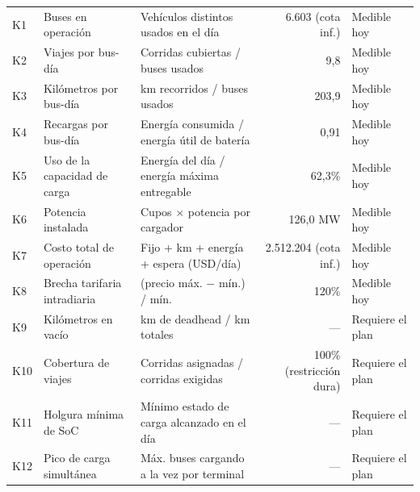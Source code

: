
\begin{tabular}{l L{3.2cm} L{5.0cm} r l}
\thead{} &  &  &  &  \\
\midrule
K1 & Buses en operación & Vehículos distintos usados en el día & 6.603 (cota inf.) & Medible hoy \\
K2 & Viajes por bus-día & Corridas cubiertas / buses usados & 9{,}8 & Medible hoy \\
K3 & Kilómetros por bus-día & km recorridos / buses usados & 203{,}9 & Medible hoy \\
K4 & Recargas por bus-día & Energía consumida / energía útil de batería & 0{,}91 & Medible hoy \\
K5 & Uso de la capacidad de carga & Energía del día / energía máxima entregable & 62{,}3\% & Medible hoy \\
K6 & Potencia instalada & Cupos $\times$ potencia por cargador & 126{,}0 MW & Medible hoy \\
K7 & Costo total de operación & Fijo + km + energía + espera (USD/día) & 2.512.204 (cota inf.) & Medible hoy \\
K8 & Brecha tarifaria intradiaria & (precio máx. $-$ mín.) / mín. & 120\% & Medible hoy \\
K9 & Kilómetros en vacío & km de deadhead / km totales & --- & Requiere el plan \\
K10 & Cobertura de viajes & Corridas asignadas / corridas exigidas & 100\% (restricción dura) & Requiere el plan \\
K11 & Holgura mínima de SoC & Mínimo estado de carga alcanzado en el día & --- & Requiere el plan \\
K12 & Pico de carga simultánea & Máx. buses cargando a la vez por terminal & --- & Requiere el plan \\
\bottomrule
\end{tabular}
